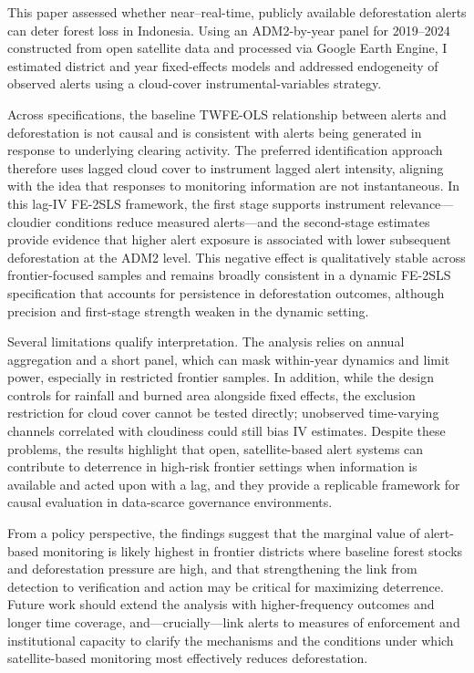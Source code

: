 \documentclass[hidelinks,12pt]{article}
\begin{document}
This paper assessed whether near–real-time, publicly available deforestation alerts can deter forest loss in Indonesia. Using an ADM2-by-year panel for 2019–2024 constructed from open satellite data and processed via Google Earth Engine, I estimated district and year fixed-effects models and addressed endogeneity of observed alerts using a cloud-cover instrumental-variables strategy.

Across specifications, the baseline TWFE-OLS relationship between alerts and deforestation is not causal and is consistent with alerts being generated in response to underlying clearing activity. The preferred identification approach therefore uses lagged cloud cover to instrument lagged alert intensity, aligning with the idea that responses to monitoring information are not instantaneous. In this lag-IV FE-2SLS framework, the first stage supports instrument relevance—cloudier conditions reduce measured alerts—and the second-stage estimates provide evidence that higher alert exposure is associated with lower subsequent deforestation at the ADM2 level. This negative effect is qualitatively stable across frontier-focused samples and remains broadly consistent in a dynamic FE-2SLS specification that accounts for persistence in deforestation outcomes, although precision and first-stage strength weaken in the dynamic setting.

Several limitations qualify interpretation. The analysis relies on annual aggregation and a short panel, which can mask within-year dynamics and limit power, especially in restricted frontier samples. In addition, while the design controls for rainfall and burned area alongside fixed effects, the exclusion restriction for cloud cover cannot be tested directly; unobserved time-varying channels correlated with cloudiness could still bias IV estimates. Despite these problems, the results highlight that open, satellite-based alert systems can contribute to deterrence in high-risk frontier settings when information is available and acted upon with a lag, and they provide a replicable framework for causal evaluation in data-scarce governance environments.

From a policy perspective, the findings suggest that the marginal value of alert-based monitoring is likely highest in frontier districts where baseline forest stocks and deforestation pressure are high, and that strengthening the link from detection to verification and action may be critical for maximizing deterrence. Future work should extend the analysis with higher-frequency outcomes and longer time coverage, and—crucially—link alerts to measures of enforcement and institutional capacity to clarify the mechanisms and the conditions under which satellite-based monitoring most effectively reduces deforestation.

\clearpage



\clearpage


 

\end{document}
